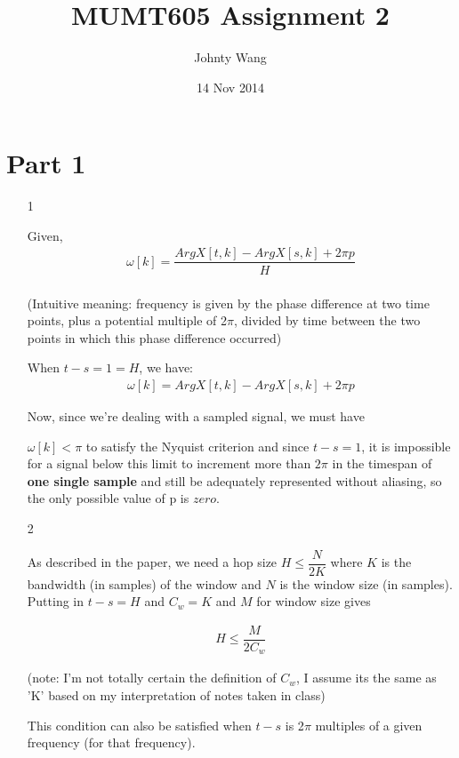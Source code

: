 \documentclass[12pt]{article}
\title{MUMT605 Assignment 2}
\author{Johnty Wang}
\date{14 Nov 2014}
\begin{document}
\maketitle

\section*{Part 1}
\begin{enumerate}


\item[1]{

Given,
\begin{align*}
\omega[k] = \dfrac{Arg X [t,k] - Arg X [s, k] + 2\pi p}{H}\\
\end{align*}

(Intuitive meaning: frequency is given by the phase difference at two time points, plus a potential multiple of 2$\pi$, divided by time between the two points in which this phase difference occurred)

When $t - s = 1 = H$, we have:
\begin{align*}
\omega[k] = Arg X [t,k] - Arg X [s, k] + 2\pi p
\end{align*}

Now, since we're dealing with a sampled signal, we must have 

$\omega[k] < \pi$ to satisfy the Nyquist criterion and since $t - s = 1$, it is impossible for a signal below this limit to increment more than $2\pi$ in the timespan of \textbf{one single sample} and still be adequately represented without aliasing, so the only possible value of p is $zero$.
}

\item[2]{

As described in the paper, we need a hop size $H \leq \dfrac{N}{2K}$ where $K$ is the bandwidth (in samples) of the window and $N$ is the window size (in samples). Putting in $t - s = H$ and $C_w = K$ and $M$ for window size gives

\begin{align*}
H \leq \dfrac{M}{2C_w}
\end{align*}

(note: I'm not totally certain the definition of $C_w$, I assume its the same as 'K' based on my interpretation of notes taken in class)

This condition can also be satisfied when $t - s$ is 2$\pi$ multiples of a given frequency (for that frequency).
}


\end{enumerate}
\end{document}
